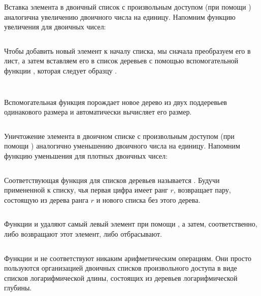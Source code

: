 \begin{frame}[fragile]{}
Вставка элемента в двоичный список с произвольным доступом (при помощи
) аналогична увеличению двоичного числа на
единицу. Напомним функцию увеличения для двоичных чисел:

\inputminted[firstline=5,lastline=7]{haskell}{code/DenseNumbers.hs}


Чтобы добавить новый элемент к началу списка, мы сначала преобразуем
его в лист, а затем вставляем его в список деревьев с помощью
вспомогательной функции , которая следует образцу
.

\inputminted[firstline=30,lastline=30,gobble=2]{haskell}{code/BinaryRandomAccessList.lhs}
\inputminted[firstline=16,lastline=18]{haskell}{code/BinaryRandomAccessList.lhs}

Вспомогательная функция  порождает новое дерево из двух
поддеревьев одинакового размера и автоматически вычисляет его размер.

\inputminted[firstline=14]{haskell}{code/BinaryRandomAccessList.lhs}
\end{frame}

\begin{frame}[fragile]{}
Уничтожение элемента в двоичном списке с произвольным доступом (при
помощи ) аналогично уменьшению двоичного числа на
единицу. Напомним функцию уменьшения для плотных двоичных чисел:
\inputminted[firstline=8,lastline=10]{haskell}{code/DenseNumbers.hs}

Соответствующая функция для списков деревьев называется
. Будучи примененной к списку, чья первая цифра
имеет ранг $r$,  возвращает пару, состоящую из
дерева ранга $r$ и нового списка без этого дерева.
\inputminted[firstline=20,lastline=24]{haskell}{code/BinaryRandomAccessList.lhs}
\end{frame}

\begin{frame}[fragile]{}
Функции  и   удаляют самый левый
элемент при помощи , а затем, соответственно,
либо возвращают этот элемент, либо отбрасывают.
\inputminted[firstline=31,lastline=32]{haskell}{code/BinaryRandomAccessList.lhs}

Функции  и  не соответствуют
никаким арифметическим операциям. Они просто пользуются организацией
двоичных списков произвольного доступа в виде списков логарифмической
длины, состоящих из деревьев логарифмической глубины. 

\end{frame}

